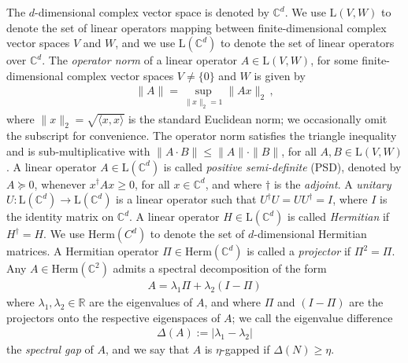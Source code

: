 \documentclass[a4paper,onecolumn,11pt]{quantumarticle}
\theoremstyle{plain}
\begin{document}
The $d$-dimensional complex vector space is denoted by $\mathbb{C}^d$. We use $\mathrm{L}(V,W)$ to denote the set of linear operators mapping between finite-dimensional complex vector spaces $V$ and $W$, and we use
$\mathrm{L}(\mathbb{C}^d)$ to denote the set of linear operators over $\mathbb{C}^d$. The \emph{operator norm} of a linear operator $A \in \mathrm{L}(V,W)$, for some finite-dimensional complex vector spaces $V \neq \{0\}$ and $W$ is given by
\begin{align}
\|A \| = \sup_{\|x\|_2 =1} \|A x\|_2 \, ,    
\end{align}
where $\|x \|_2 = \sqrt{\langle x,x \rangle}$ is the standard Euclidean norm; we occasionally omit the subscript for convenience. The operator norm satisfies the triangle inequality and is sub-multiplicative with $\|A \cdot B\| \leq \|A\| \cdot \|B\|$, for all $A,B \in \mathrm{L}(V,W)$.
A linear operator $A \in \mathrm{L}(\mathbb{C}^d)$ is called \emph{positive semi-definite} (PSD), denoted by $A \succeq 0$, whenever $x^\dag A x \geq 0$, for all $x \in \mathbb{C}^d$, and where $\dag$ is the \emph{adjoint}.
A \emph{unitary} $U: \mathrm{L} (\mathbb{C}^d) \to \mathrm{L}(\mathbb{C}^d)$ is a linear operator such that $U^\dagger U = U U^\dagger = I$, where $I$ is the identity matrix on $\mathbb{C}^d$. 
A linear operator $H \in \mathrm{L}(\mathbb{C}^d)$ is called \emph{Hermitian} if $H^\dag = H$. We use $\mathrm{Herm}(C^{d})$ to denote the set of $d$-dimensional Hermitian matrices. 
A Hermitian operator $\Pi \in \mathrm{Herm}(\mathbb{C}^{d})$ is called a \emph{projector} if $\Pi^2=\Pi$. Any $A \in \mathrm{Herm}(\mathbb{C}^{2})$ admits a spectral decomposition of the form 
\begin{align}
 A = \lambda_1 \Pi + \lambda_2 (I -\Pi)   
\end{align}
where $\lambda_1,\lambda_2 \in \mathbb{R}$ are the eigenvalues of $A$, and where $\Pi$ and $(I-\Pi)$ are the projectors onto the respective eigenspaces of $A$; we call the eigenvalue difference
\begin{align}
\Delta(A) := |\lambda_1 - \lambda_2|   
\end{align}
the \emph{spectral gap} of $A$, and we say that $A$ is
$\eta$-gapped if $\Delta(N) \geq \eta$.
\end{document}

